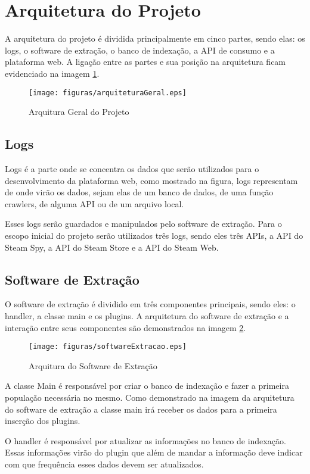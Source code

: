 \section{Arquitetura do Projeto}
A arquitetura do projeto é dividida principalmente em cinco partes, sendo elas: os logs, o software de extração, o banco de indexação, a API de consumo e a plataforma web. A ligação entre as partes e sua posição na arquitetura ficam evidenciado na imagem \ref{image:arquitetura}.
\begin{figure}
\centering
\texttt{[image: figuras/arquiteturaGeral.eps]}
\caption{Arquitura Geral do Projeto}
\label{image:arquitetura}
\end{figure}
\subsection{Logs}
Logs é a parte onde se concentra os dados que serão utilizados para o desenvolvimento da plataforma web, como mostrado na figura, logs representam de onde virão os dados, sejam elas de um banco de dados, de uma função crawlers, de alguma API ou de um arquivo local.

Esses logs serão guardados e manipulados pelo software de extração. Para o escopo inicial do projeto serão utilizados três logs, sendo eles três APIs, a API do Steam Spy, a API do Steam Store e a API do Steam Web.
\subsection{Software de Extração}
O software de extração é dividido em três componentes principais, sendo eles: o handler, a classe main e os plugins. A arquitetura do software de extração e a interação entre seus componentes são demonstrados na imagem \ref{image:extracao}.
\begin{figure}
\centering
\texttt{[image: figuras/softwareExtracao.eps]}
\caption{Arquitura do Software de Extração}
\label{image:extracao}
\end{figure}
A classe Main é responsável por criar o banco de indexação e fazer a primeira população necessária no mesmo. Como demonstrado na imagem da arquitetura do software de extração a classe main irá receber os dados para a primeira inserção dos plugins.

O handler é responsável por atualizar as informações no banco de indexação. Essas informações virão do plugin que além de mandar a informação deve indicar com que frequência esses dados devem ser atualizados.

